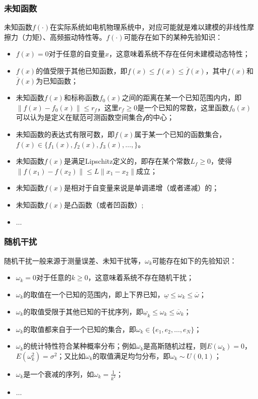 \subsubsection{未知函数}\label{subsubsect:2.2.2.2}
未知函数$f(\cdot)$在实际系统如电机物理系统中，对应可能就是难以建模的非线性摩擦力（力矩）、高频振动特性等。$f(\cdot)$可能存在如下的某种先验知识：
\begin{itemize}
\item $f(x)=0$对于任意的自变量$x$，这意味着系统不存在任何未建模动态特性；
\item $f(x)$的值受限于其他已知函数，即$\underline{f}(x)\leq f(x)\leq\overline{f}(x)$，其中$\underline{f}(x)$和$\overline{f}(x)$为已知函数；
\item 未知函数$f(x)$和标称函数$f_{0}(x)$之间的距离在某一个已知范围内内，即$\|f(x)-f_{0}(x)\|\leq r_{f}$，这里$r_{f}\geq0$是一个已知的常数，这里函数$f_{0}(x)$可以认为是定义在赋范可测函数空间集合$\mathcal{f}$的中心；
\item 未知函数的表达式有限可数，即$f(x)$属于某一个已知的函数集合，$f(x)\in\{f_{1}(x),f_{2}(x),f_{3}(x),\dots,\}$。
\item 未知函数$f(x)$是满足Lipschitz定义的，即存在某个常数$L_{f}\geq0$，使得$\|f(x_{1})-f(x_{2})\|\leq L\|x_{1}-x_{2}\|$成立；
\item 未知函数$f(x)$是相对于自变量来说是单调递增（或者递减）的；
\item 未知函数$f(x)$是凸函数（或者凹函数）;
\item $\dots$
\end{itemize}
\subsubsection{随机干扰}\label{subsubsect:2.2.2.3}
随机干扰一般来源于测量误差、未知干扰等，$\omega_{k}$可能存在如下的先验知识：
\begin{itemize}%
\item $\omega_{k}=0$对于任意的$k\geq0$，这意味着系统不存在随机干扰；
\item $\omega_{k}$的取值在一个已知的范围内，即上下界已知，$\underline{\omega}\leq\omega_{k}\leq\overline{\omega}$；
\item $\omega_{k}$的取值受限于其他已知的干扰序列，即$\underline{\omega}_{k}\leq\omega_{k}\leq\overline{\omega}_{k}$；
\item $\omega_{k}$的取值都来自于一个已知的集合，即$\omega_{k}\in\{e_{1}, e_{2},\ldots,e_{N}\}$；
\item $\omega_{k}$的统计特性符合某种概率分布；例如$\omega_{k}$是高斯随机过程，则$E(\omega_{k})=0$，$E(\omega_{k}^{2})=\sigma^{2}$；又比如$\omega_{k}$的取值满足均匀分布，即$\omega_{k}\sim U(0,1)$；
\item $\omega_{k}$是一个衰减的序列，如$\omega_{k}=\frac1{k^{2}}$；
\item $\dots$
\end{itemize}

